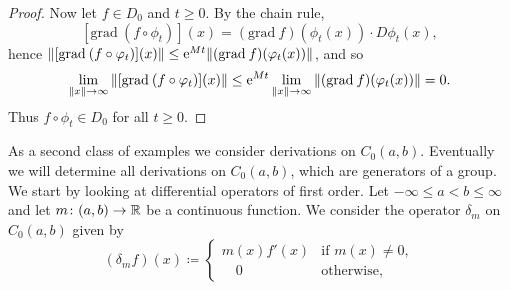 \begin{proof}
Now let $f \in D_{0}$ and $t \geq 0$. By the chain rule,
\[
    [\mathrm{grad}\:(f \circ \phi_{t})](x) = (\mathrm{grad}\: f)(\phi_{t}(x)) \cdot D\phi_{t}(x),
\]
hence $\|[\mathrm{grad}\:(f \circ \phi_{t})](x)\| \leq \eu^{Mt}\|(\mathrm{grad}\: f)(\phi_{t}(x))\|$, and so
\[
    \lim_{\|x\| \to \infty} \|[\mathrm{grad}\:(f \circ \phi_{t})](x)\|
    \leq \eu^{Mt} \lim_{\|x\| \to \infty} \|(\mathrm{grad}\: f)(\phi_{t}(x))\| = 0.
\]
Thus $f \circ \phi_{t} \in D_{0}$ for all $t \geq 0$.
\end{proof}
As a second class of examples we consider derivations on $C_{0}(a,b)$.
Eventually we will determine all derivations on $C_{0}(a,b)$, which are generators of a group.
We start by looking at differential operators of first order.
Let $-\infty \leq a < b \leq \infty$ and let $m \colon (a,b) \to \mathbb{R}$ be a continuous function.
We consider the operator $\delta_{m}$ on $C_{0}(a,b)$ given by
\begin{equation*}\label{eq:b2-delta-m}
(\delta_{m}f)(x) \coloneq \begin{cases}
    m(x)f'(x) & \text{if } m(x) \neq 0 , \\
    \quad 0 & \text{otherwise} ,
\end{cases}
\end{equation*}
